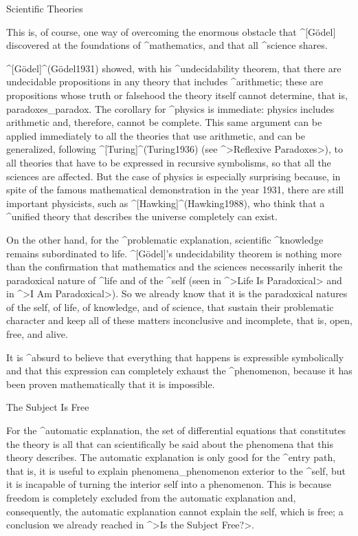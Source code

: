 \Section Scientific Theories

This is, of course, one way of overcoming the enormous obstacle that
^[Gödel] discovered at the foundations of ^{mathematics}, and that all
^{science} shares.

^[Gödel]^(G\"odel1931) showed, with his ^{undecidability} theorem, that
there are undecidable propositions in any theory that includes
^{arithmetic}; these are propositions whose truth or falsehood the
theory itself cannot determine, that is, paradoxes_{paradox}. The
corollary for ^{physics} is immediate: physics includes arithmetic and,
therefore, cannot be complete. This same argument can be applied
immediately to all the theories that use arithmetic, and can be
generalized, following ^[Turing]^(Turing1936) (see ^>Reflexive
Paradoxes>), to all theories that have to be expressed in recursive
symbolisms, so that all the sciences are affected. But the case of
physics is especially surprising because, in spite of the famous
mathematical demonstration in the year 1931, there are still important
physicists, such as ^[Hawking]^(Hawking1988), who think that a ^{unified
theory} that describes the universe completely can exist.

On the other hand, for the ^{problematic explanation}, scientific
^{knowledge} remains subordinated to life. ^[Gödel]'s undecidability
theorem is nothing more than the confirmation that mathematics and the
sciences necessarily inherit the paradoxical nature of ^{life} and of
the ^{self} (seen in ^>Life Is Paradoxical> and in ^>I Am Paradoxical>).
So we already know that it is the paradoxical natures of the self, of
life, of knowledge, and of science, that sustain their problematic
character and keep all of these matters inconclusive and incomplete,
that is, open, free, and alive.

It is ^{absurd} to believe that everything that happens is expressible
symbolically and that this expression can completely exhaust the
^{phenomenon}, because it has been proven mathematically that it is
impossible.


\Section The Subject Is Free

For the ^{automatic explanation}, the set of differential equations that
constitutes the theory is all that can scientifically be said about the
phenomena that this theory describes. The automatic explanation is only
good for the ^{entry path}, that is, it is useful to explain
phenomena_{phenomenon}  exterior to the ^{self}, but it is incapable of
turning the interior self into a phenomenon. This is because freedom is
completely excluded from the automatic explanation and, consequently,
the automatic explanation cannot explain the self, which is free; a
conclusion we already reached in ^>Is the Subject Free?>.

